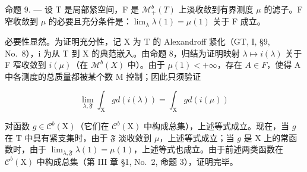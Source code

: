 命题 9. --- 设 T 是局部紧空间，F 是 \(\mathcal{M}_{+}^{b}(T)\) 上淡收敛到有界测度 \(\mu\) 的滤子。F 窄收敛到 \(\mu\) 的必要且充分条件是：\(\lim_{\lambda}\lambda(1)=\mu(1)\) 关于 F 成立。

必要性显然。为证明充分性，记 X 为 T 的 Alexandroff 紧化（GT, I, §9, No.~8），i 为从 T 到 X 的典范嵌入。由命题 8，归结为证明映射 \(\lambda \mapsto i(\lambda)\) 关于 F 窄收敛到 \(i(\mu)\)（在 \(\mathcal{M}^{b}(X)\) 中）。由于 \(\mu(1) < +\infty\)，存在 \(A \in F\)，使得 A 中各测度的总质量都被某个数 M 控制；因此只须验证

\[
\lim _ {\lambda , \mathfrak {F}} \int_ {\mathrm{X}} g d (i (\lambda)) = \int_ {\mathrm{X}} g d (i (\mu))\tag{5}
\]

对函数 \(g \in \mathcal{C}^b(\mathrm{X})\)（它们在 \(\mathcal{C}^b(\mathrm{X})\) 中构成总集），上述等式成立。现在，当 \(g\) 在 \(\mathrm{T}\) 中具有紧支集时，由于 \(\mathfrak{F}\) 淡收敛到 \(\mu\)，上述等式成立；当 \(g\) 是 \(\mathrm{X}\) 上的常函数时，由于 \(\lim_{\lambda, \mathfrak{F}} \lambda(1) = \mu(1)\)，上述等式也成立。由于前述两类函数在 \(\mathcal{C}^b(\mathrm{X})\) 中构成总集（第 III 章 §1, No.~2, 命题 3），证明完毕。

